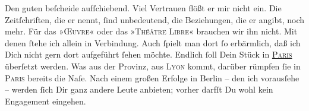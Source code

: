 \pstart
           Den guten \label{K_L02762-4v}\label{K_L02762-4} beſcheide aufſchiebend. Viel Vertrauen flößt er mir nicht ein. Die
               Zeitſchriften, die er  nennt, ſind unbedeutend,
               die  Beziehungen, die er angibt, noch mehr. Für
               das »\textsc{Œuvre}« oder das »\textsc{Théâtre Libre}« brauchen wir ihn nicht. Mit denen ſtehe ich allein in Verbindung. Auch ſpielt
               man dort ſo erbärmlich, daß ich Dich nicht gern dort aufgeführt ſehen {\pb}möchte. Endlich ſoll Dein Stück in \textsc{\uline{Paris}} überſetzt werden. Was aus der Provinz, aus \textsc{Lyon} kommt, darüber rümpfen ſie in \textsc{Paris} bereits die Naſe. Nach einem großen Erfolge in Berlin – den ich \strikeout{\textcolor{gray}{×}} vorausſehe – werden ſich Dir ganz andere Leute anbieten; vorher darfſt Du wohl
               kein Engagement eingehen.\pend
           
